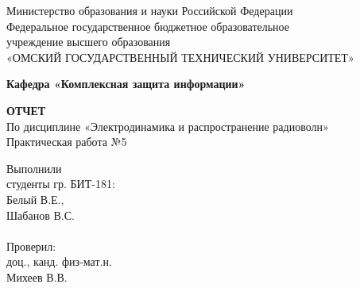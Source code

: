 \documentclass[fontsize=14pt,a4paper]{scrartcl}
\begin{document}
  \begin{titlepage}                                                         
    \newpage                                                                        
    \begin{center}   
      Министерство образования и науки Российской Федерации  \\ 
      \vspace{1em}                                                    
      {\mdseries
        Федеральное государственное бюджетное образовательное \\
        учреждение высшего образования \\
        «ОМСКИЙ ГОСУДАРСТВЕННЫЙ ТЕХНИЧЕСКИЙ УНИВЕРСИТЕТ»
      }                               
      \vspace{1em}      

      {\bfseries Кафедра «Комплексная защита информации»}  

      \vspace{\fill}                                                         
                                   
      {\bfseries ОТЧЕТ } \\                                 
      По дисциплине «Электродинамика и распространение радиоволн» \\ 
      \vspace{1em} 
      Практическая работа №5 \\                                                           
    \end{center}                                                          
                                                                                        
    \vspace{\fill}                                                         
                                                                                        
    \hfill\parbox{5cm}{
      Выполнили\\
      студенты гр. БИТ-181:\\
      Белый В.Е., \\
      Шабанов В.С.\\
      \\
      Проверил:\\
      доц., канд. физ-мат.н. \\
      Михеев В.В.\\
    }                                                                                                                              
                                                                                                                                                                              

\end{titlepage}
\end{document}
